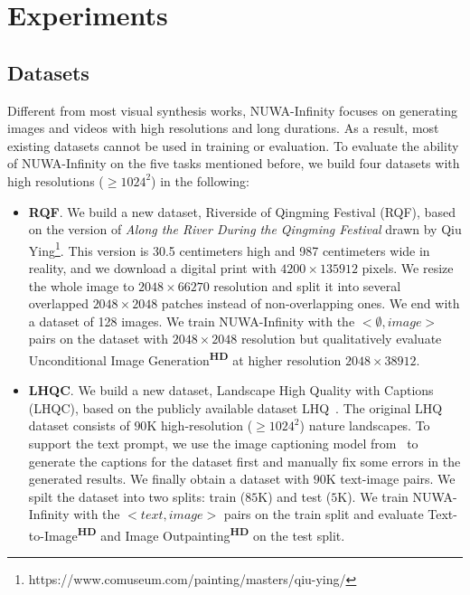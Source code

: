 \documentclass{article}
\begin{document}
\section{Experiments}
\vspace{-2mm}
\subsection{Datasets}
\vspace{-2mm}
Different from most visual synthesis works, NUWA-Infinity focuses on generating images and videos with high resolutions and long durations. As a result, most existing datasets cannot be used in training or evaluation. To evaluate the ability of NUWA-Infinity on the five tasks mentioned before, we build four datasets with high resolutions ($\geqslant 1024^{2}$) in the following:
\begin{itemize}[leftmargin=*]

\item \textbf{RQF}. We build a new dataset, Riverside of Qingming Festival (RQF), based on the version of \emph{\textit{Along the River During the Qingming Festival}} drawn by Qiu Ying\footnote{https://www.comuseum.com/painting/masters/qiu-ying/}. This version is 30.5 centimeters high and 987 centimeters wide in reality, and we download a digital print with $4200\times 135912$ pixels. We resize the whole image to $2048\times 66270$ resolution and split it into several overlapped $2048\times 2048$ patches instead of non-overlapping ones. We end with a dataset of 128 images.  We train NUWA-Infinity with the $<\emptyset, image>$ pairs on the dataset with $2048\times 2048$ resolution but qualitatively evaluate Unconditional Image Generation\textsuperscript{\textbf{HD}} at higher resolution $2048\times 38912$.


\item \textbf{LHQC}. We build a new dataset, Landscape High Quality with Captions (LHQC), based on the publicly available dataset LHQ~\cite{skorokhodovAligningLatentImage2021}. The original LHQ dataset consists of $90$K high-resolution ($\geqslant 1024^{2}$) nature landscapes. To support the text prompt, we use the image captioning model from~\cite{wangGITGenerativeImagetotext2022} to generate the captions for the dataset first and manually fix some errors in the generated results. We finally obtain a dataset with $90$K text-image pairs. We spilt the dataset into two splits: train ($85$K) and test ($5$K). We train NUWA-Infinity with the $<text, image>$ pairs on the train split and evaluate Text-to-Image\textsuperscript{\textbf{HD}} and Image Outpainting\textsuperscript{\textbf{HD}} on the test split.


\end{itemize}
\end{document}
